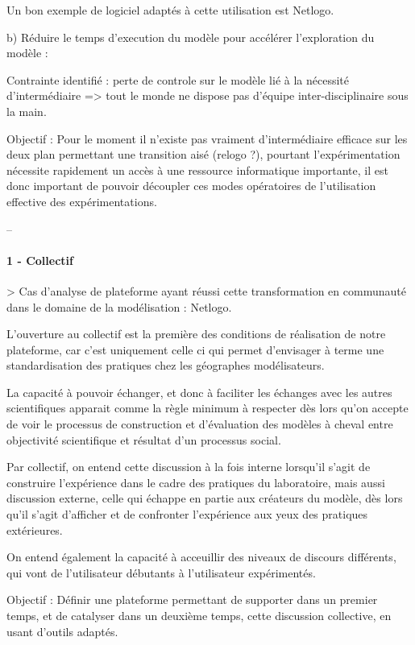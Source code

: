 Un bon exemple de logiciel adaptés à cette utilisation est Netlogo.

b) Réduire le temps d'execution du modèle pour accélérer l'exploration du modèle : 

Contrainte identifié : perte de controle sur le modèle lié à la nécessité d'intermédiaire => tout le monde ne dispose pas d'équipe inter-disciplinaire sous la main.

Objectif : Pour le moment il n'existe pas vraiment d'intermédiaire efficace sur les deux plan permettant une transition aisé (relogo ?), pourtant l'expérimentation nécessite rapidement un accès à une ressource informatique importante, il est donc important de pouvoir découpler ces modes opératoires de l'utilisation effective des expérimentations.

--

\paragraph{1 - Collectif}

> Cas d'analyse de plateforme ayant réussi cette transformation en communauté dans le domaine de la modélisation : Netlogo.

L'ouverture au collectif est la première des conditions de réalisation de notre plateforme, car c'est uniquement celle ci qui permet d'envisager à terme une standardisation des pratiques chez les géographes modélisateurs. %

La capacité à pouvoir échanger, et donc à faciliter les échanges avec les autres scientifiques apparait comme la règle minimum à respecter dès lors qu'on accepte de voir le processus de construction et d'évaluation des modèles à cheval entre objectivité scientifique et résultat d'un processus social. 

Par collectif, on entend cette discussion à la fois interne lorsqu'il s'agit de construire l'expérience dans le cadre des pratiques du laboratoire, mais aussi discussion externe, celle qui échappe en partie aux créateurs du modèle, dès lors qu'il s'agit d'afficher et de confronter l'expérience aux yeux des pratiques extérieures.

On entend également la capacité à acceuillir des niveaux de discours différents, qui vont de l'utilisateur débutants à l'utilisateur expérimentés.

Objectif : Définir une plateforme permettant de supporter dans un premier temps, et de catalyser dans un deuxième temps, cette discussion collective, en usant d'outils adaptés. 

